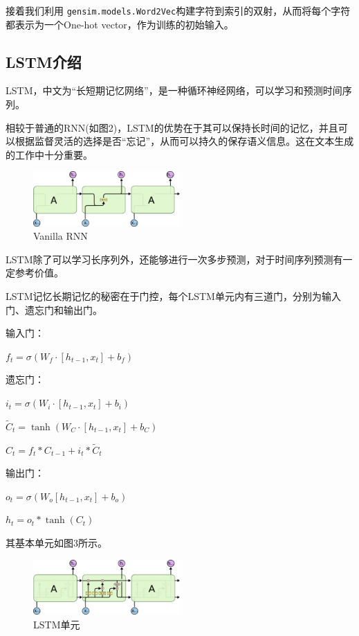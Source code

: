 \documentclass[12pt,a4paper]{article}
\begin{document}
    接着我们利用 \verb|gensim.models.Word2Vec|构建字符到索引的双射，从而将每个字符都表示为一个One-hot vector，作为训练的初始输入。
\subsection{LSTM介绍}
    LSTM，中文为“长短期记忆网络”，是一种循环神经网络，可以学习和预测时间序列。
    
相较于普通的RNN(如图2)，LSTM的优势在于其可以保持长时间的记忆，并且可以根据监督灵活的选择是否“忘记”，从而可以持久的保存语义信息。这在文本生成的工作中十分重要。
    
    \begin{figure}[!h]
        \centering
        \includegraphics[width=0.5\textwidth]{图片8.png}
        \caption{Vanilla RNN}
    \end{figure}
    
    LSTM除了可以学习长序列外，还能够进行一次多步预测，对于时间序列预测有一定参考价值。
    
    LSTM记忆长期记忆的秘密在于门控，每个LSTM单元内有三道门，分别为输入门、遗忘门和输出门。

    输入门：
    
    $f_{t}=\sigma\left(W_{f} \cdot\left[h_{t-1}, x_{t}\right]+b_{f}\right)$
    
    遗忘门：
    
    $i_{t}=\sigma\left(W_{i} \cdot\left[h_{t-1}, x_{t}\right]+b_{i}\right)$
    
    $\tilde{C}_{t}=\tanh \left(W_{C} \cdot\left[h_{t-1}, x_{t}\right]+b_{C}\right)$
    
    $C_{t}=f_{t} * C_{t-1}+i_{t} * \tilde{C}_{t}$
    
    输出门：
    
    $o_{t}=\sigma\left(W_{o}\left[h_{t-1}, x_{t}\right]+b_{o}\right)$
    
    $h_{t}=o_{t} * \tanh \left(C_{t}\right)$
    
   其基本单元如图3所示。\cite{ref3}
    \begin{figure}[!h]
        \centering
        \includegraphics[width=0.5\textwidth]{图片7.png}
        \caption{LSTM单元}
    \end{figure}
\end{document}
